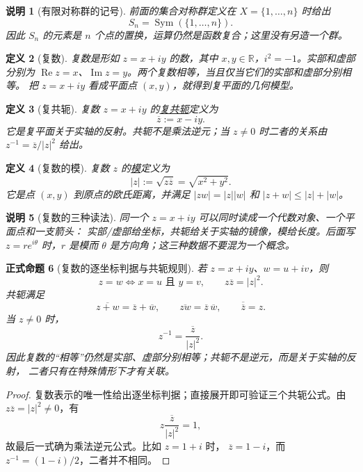 \documentclass[UTF8,fontset=none,a4paper,11pt]{ctexart}
\theoremstyle{foundation-definition}
\newtheorem{definition}{定义}[section]
\theoremstyle{foundation-theorem}
\theoremstyle{foundation-proposition}
\newtheorem{proposition}[definition]{正式命题}
\theoremstyle{foundation-example}
\theoremstyle{foundation-remark}
\newtheorem{remark}[definition]{说明}
\theoremstyle{foundation-theorem}
\newcommand{\term}[2]{\hyperref[#1]{#2}}
\begin{document}
\begin{remark}[有限对称群的记号]
前面的集合对称群定义在 \(X=\{1,\dots,n\}\) 时给出
\[
S_n=\operatorname{Sym}(\{1,\dots,n\}).
\]
因此 \(S_n\) 的元素是 \(n\) 个点的置换，运算仍然是函数复合；这里没有另造一个群。
\end{remark}

\begin{definition}[复数]\label{def:complex-number}
复数是形如 \(z=x+iy\) 的数，其中 \(x,y\in\mathbb R\)，\(i^2=-1\)。实部和虚部分别为
\(\operatorname{Re}z=x\)、\(\operatorname{Im}z=y\)。两个复数相等，当且仅当它们的实部和虚部分别相等。
把 \(z=x+iy\) 看成平面点 \((x,y)\)，就得到复平面的几何模型。
\end{definition}

\begin{definition}[复共轭]\label{def:complex-conjugate}
复数 \(z=x+iy\) 的\term{def:complex-conjugate}{复共轭}定义为
\[
\overline z:=x-iy.
\]
它是复平面关于实轴的反射。共轭不是乘法逆元；当 \(z\ne0\) 时二者的关系由
\(z^{-1}=\overline z/|z|^2\) 给出。
\end{definition}

\begin{definition}[复数的模]\label{def:complex-modulus}
复数 \(z\) 的\term{def:complex-modulus}{模}定义为
\[
|z|:=\sqrt{z\overline z}=\sqrt{x^2+y^2}.
\]
它是点 \((x,y)\) 到原点的欧氏距离，并满足
\(|zw|=|z||w|\) 和 \(|z+w|\leq |z|+|w|\)。
\end{definition}

\begin{remark}[复数的三种读法]
同一个 \(z=x+iy\) 可以同时读成一个代数对象、一个平面点和一支箭头：
实部/虚部给坐标，共轭给关于实轴的镜像，模给长度。后面写
\(z=re^{i\theta}\) 时，\(r\) 是模而 \(\theta\) 是方向角；这三种数据不要混为一个概念。
\end{remark}

\begin{proposition}[复数的逐坐标判据与共轭规则]
若 \(z=x+iy\)、\(w=u+iv\)，则
\[
z=w\Longleftrightarrow x=u\text{ 且 }y=v,
\qquad
z\overline z=|z|^2.
\]
共轭满足
\[
\overline{z+w}=\overline z+\overline w,\qquad
\overline{zw}=\overline z\,\overline w,\qquad
\overline{\overline z}=z.
\]
当 \(z\ne0\) 时，
\[
z^{-1}=\frac{\overline z}{|z|^2}.
\]
因此复数的“相等”仍然是实部、虚部分别相等；共轭不是逆元，而是关于实轴的反射，
二者只有在特殊情形下才有关联。
\end{proposition}

\begin{proof}
复数表示的唯一性给出逐坐标判据；直接展开即可验证三个共轭公式。由
\(z\overline z=|z|^2\ne0\)，有
\[
z\frac{\overline z}{|z|^2}=1,
\]
故最后一式确为乘法逆元公式。比如 \(z=1+i\) 时，
\(\overline z=1-i\)，而 \(z^{-1}=(1-i)/2\)，二者并不相同。
\end{proof}
\end{document}
